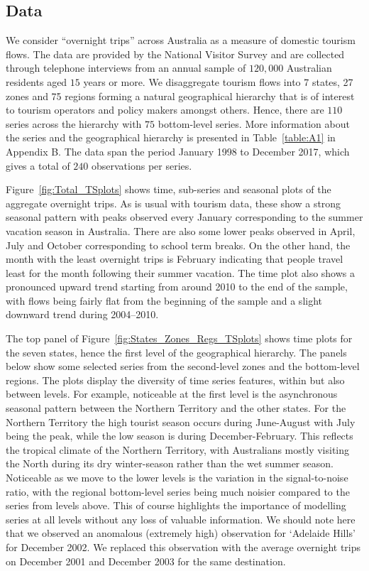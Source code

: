 \documentclass[12pt]{article}
\theoremstyle{definition}
\begin{document}
\subsection{Data}

We consider ``overnight trips'' across Australia as a measure of domestic tourism flows. The data are provided by the National Visitor Survey and are collected through telephone interviews from an annual sample of $120,000$ Australian residents aged $15$ years or more. We disaggregate tourism flows into 7 states, 27 zones and 75 regions forming a natural geographical hierarchy that is of interest to tourism operators and policy makers amongst others. Hence, there are $110$ series across the hierarchy with $75$ bottom-level series. More information about the series and the geographical hierarchy is presented in Table~\ref{table:A1} in Appendix B\@. The data span the period January 1998 to December 2017, which gives a total of $240$ observations per series.

Figure~\ref{fig:Total_TSplots} shows time, sub-series and seasonal plots of the aggregate overnight trips. As is usual with tourism data, these show a strong seasonal pattern with peaks observed every January corresponding to the summer vacation season in Australia. There are also some lower peaks observed in April, July and October corresponding to school term breaks. On the other hand, the month with the least overnight trips is February indicating that people travel least for the month following their summer vacation. The time plot also shows a pronounced upward trend starting from around 2010 to the end of the sample, with flows being fairly flat from the beginning of the sample and a slight downward trend during 2004--2010.

The top panel of Figure~\ref{fig:States_Zones_Regs_TSplots} shows time plots for the seven states, hence the first level of the geographical hierarchy. The panels below show some selected series from the second-level zones and the bottom-level regions. The plots display the diversity of time series features, within but also between levels. For example, noticeable at the first level is the asynchronous seasonal pattern between the Northern Territory and the other states. For the Northern Territory the high tourist season occurs during June-August with July being the peak, while the low season is during December-February. This reflects the tropical climate of the Northern Territory, with Australians mostly visiting the North during its dry winter-season rather than the wet summer season. Noticeable as we move to the lower levels is the variation in the signal-to-noise ratio, with the regional bottom-level series being much noisier compared to the series from levels above. This of course highlights the importance of modelling series at all levels without any loss of valuable information. We should note here that we observed an anomalous (extremely high) observation for `Adelaide Hills' for December 2002. We replaced this observation with the average overnight trips on December 2001 and December 2003 for the same destination.
\end{document}
